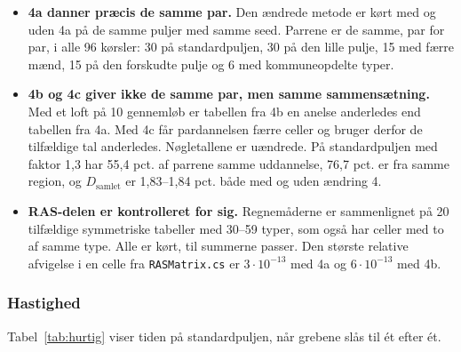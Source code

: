 \documentclass[11pt,a4paper]{article}
\newcommand{\kode}[1]{\texttt{#1}}
\begin{document}
\begin{itemize}
\item \textbf{4a danner præcis de samme par.} Den ændrede metode er kørt med og uden 4a på de samme
puljer med samme seed. Parrene er de samme, par for par, i alle 96 kørsler: 30 på standardpuljen,
30 på den lille pulje, 15 med færre mænd, 15 på den forskudte pulje og 6 med kommuneopdelte typer.
\item \textbf{4b og 4c giver ikke de samme par, men samme sammensætning.} Med et loft på 10
gennemløb er tabellen fra 4b en anelse anderledes end tabellen fra 4a. Med 4c får pardannelsen færre
celler og bruger derfor de tilfældige tal anderledes. Nøgletallene er uændrede. På standardpuljen
med faktor 1,3 har 55,4 pct. af parrene samme uddannelse, 76,7 pct. er fra samme region, og
$D_{\text{samlet}}$ er 1,83--1,84 pct. både med og uden ændring 4.
\item \textbf{RAS-delen er kontrolleret for sig.} Regnemåderne er sammenlignet på 20 tilfældige
symmetriske tabeller med 30--59 typer, som også har celler med to af samme type. Alle er kørt, til
summerne passer. Den største relative afvigelse i en celle fra \kode{RASMatrix.cs} er
$3\cdot10^{-13}$ med 4a og $6\cdot10^{-13}$ med 4b.
\end{itemize}

\subsubsection*{Hastighed}

Tabel~\ref{tab:hurtig} viser tiden på standardpuljen, når grebene slås til ét efter ét.
\end{document}
